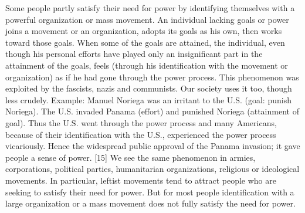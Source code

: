  Some people partly satisfy their need for power by identifying themselves with a powerful organization or mass movement. An individual lacking goals or power joins a movement or an organization, adopts its goals as his own, then works toward those goals. When some of the goals are attained, the individual, even though his personal efforts have played only an insignificant part in the attainment of the goals, feels (through his identification with the movement or organization) as if he had gone through the power process. This phenomenon was exploited by the fascists, nazis and communists. Our society uses it too, though less crudely. Example: Manuel Noriega was an irritant to the U.S. (goal: punish Noriega). The U.S. invaded Panama (effort) and punished Noriega (attainment of goal). Thus the U.S. went through the power process and many Americans, because of their identification with the U.S., experienced the power process vicariously. Hence the widespread public approval of the Panama invasion; it gave people a sense of power. [15] We see the same phenomenon in armies, corporations, political parties, humanitarian organizations, religious or ideological movements. In particular, leftist movements tend to attract people who are seeking to satisfy their need for power. But for most people identification with a large organization or a mass movement does not fully satisfy the need for power.
